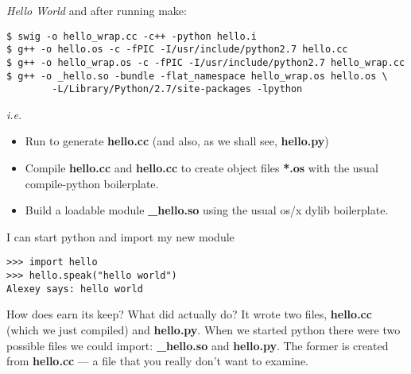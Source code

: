 \documentclass[10pt, t]{beamer}
\let\texttt=\graytt
\let\alert=\textbf
\newcommand{\swig}{\texttt{swig}\xspace}  %
\begin{document}
\begin{frame}[fragile,label=sec-6-4]{\emph{Hello World}}
 and after running make:
\lstset{language=textc,label= ,caption= ,numbers=none}
\begin{lstlisting}
$ swig -o hello_wrap.cc -c++ -python hello.i
$ g++ -o hello.os -c -fPIC -I/usr/include/python2.7 hello.cc
$ g++ -o hello_wrap.os -c -fPIC -I/usr/include/python2.7 hello_wrap.cc
$ g++ -o _hello.so -bundle -flat_namespace hello_wrap.os hello.os \
        -L/Library/Python/2.7/site-packages -lpython
\end{lstlisting}

\gdef\hello{\_hello}
\pause
\emph{i.e.}
\begin{itemize}
\item Run \swig to generate \alert{hello\wrap.cc} (and also, as we shall see, \alert{hello.py})
\item Compile \alert{hello.cc} and \alert{hello\wrap.cc} to create object files \textbf{*.os}
    with the usual compile-python boilerplate.
\item Build a loadable module \alert{\hello.so} using the usual os/x dylib boilerplate.
\end{itemize}

\pause
I can start python and import my new module
\pause
\lstset{language=Python,label= ,caption= ,numbers=none}
\begin{lstlisting}
>>> import hello
>>> hello.speak("hello world")
Alexey says: hello world
\end{lstlisting}
\end{frame}

\begin{frame}[label=sec-6-5]{How does \swig earn its keep?}
What did \swig actually do?  It wrote two files, \alert{hello\wrap.cc} (which we just compiled)
and \alert{hello.py}.  When we started python there were two possible files we could import:
\alert{\hello.so} and \alert{hello.py}. The former is created from \alert{hello\wrap.cc} --- a
file that you really don't want to examine.
\end{frame}
\end{document}
